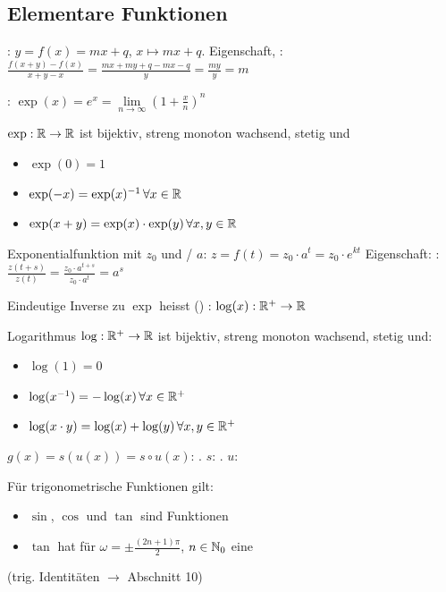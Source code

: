 \subsection{Elementare Funktionen}

\Def {}: $y = f(x) = mx + q$, $x \mapsto mx + q$. Eigenschaft, :
$\frac{f(x+y)-f(x)}{x+y-x} = \frac{mx + my + q -mx - q}{y} = \frac{my}{y} = m$

\Def {}: $\exp(x) = e^x = \lim\limits_{n\to\infty} \left(1 + \frac{x}{n}\right)^n$

\Satz $\exp: \mathbb{R} \to \mathbb{R}$ ist bijektiv, streng monoton wachsend, stetig und
\vspace{-0.6em}
\begin{itemize}
    \item $\exp(0) = 1$
    \item $\exp(-x) = \exp(x)^{-1} \, \forall x \in \mathbb{R}$
    \item $\exp(x + y) = \exp(x)\cdot\exp(y) \, \forall x,y \in \mathbb{R}$
\end{itemize}

\Def Exponentialfunktion mit  $z_0$ und / $a$: $z = f(t) = z_0 \cdot a^t = z_0 \cdot e^{kt}$
Eigenschaft: : $\frac{z(t + s)}{z(t)} = \frac{z_0 \cdot a^{t + s}}{z_0 \cdot a^t} = a^s$

\Def Eindeutige Inverse zu $\exp$ heisst () : $\log(x): \mathbb{R}^+ \to \mathbb{R}$

\Satz Logarithmus $\log: \mathbb{R}^+ \to \mathbb{R}$ ist bijektiv, streng monoton wachsend, stetig und:
\vspace{-0.6em}
\begin{itemize}
    \item $\log(1) = 0$
    \item $\log(x^{-1}) = -\log(x) \, \forall x \in \mathbb{R}^+$
    \item $\log(x \cdot y) = \log(x) + \log(y) \, \forall x,y \in \mathbb{R}^+$
\end{itemize}

\Def $g(x) = s(u(x)) = s \circ u(x)$: . $s$: . $u$: 

\Satz Für trigonometrische Funktionen gilt:
\vspace{-0.6em}
\begin{itemize}
    \item $\sin$, $\cos$ und $\tan$ sind  Funktionen
    \item $\tan$ hat für $\omega = \pm \frac{(2n+1)\pi}{2}$, $n \in \mathbb{N}_0$ eine 
\end{itemize}
(trig. Identitäten $\to$ Abschnitt 10)

